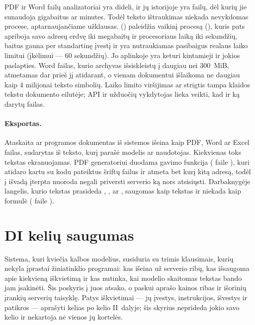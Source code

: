 PDF ir Word failų analizatoriai yra dideli, ir jų istorijoje yra failų, dėl kurių jie
sunaudoja gigabaitus ar minutes. Todėl teksto ištraukimas niekada nevykdomas procese,
aptarnaujančiame užklausas.  () paleidžia
vaikinį procesą (), kuris pats apriboja savo adresų erdvę iki
 \code{=}  megabaitų ir procesoriaus laiką iki
 \code{=}  sekundžių, baitus gauna per standartinę įvestį ir yra
nutraukiamas pasibaigus realaus laiko limitui (įkėlimui --- 60 sekundžių). Jo aplinkoje yra
keturi kintamieji ir jokios paslapties. Word failas, kurio archyvas išsiskleistų į daugiau nei
300~MiB, atmetamas dar prieš jį atidarant, o vienam dokumentui išlaikoma ne daugiau kaip
4 milijonai teksto simbolių. Laiko limito viršijimas ar strigtis tampa klaidos tekstu dokumento
eilutėje; API ir užduočių vykdytojas lieka veikti, kad ir ką darytų failas.

\paragraph{Eksportas.} Ataskaita ar programos dokumentas iš sistemos išeina kaip PDF, Word ar
Excel failas, sudarytas iš teksto, kurį parašė modelis ar naudotojas. Kiekvienas toks tekstas
ekranuojamas. PDF generatoriui duodama gavimo funkcija ( faile
), kuri atidaro kartu su kodu pateiktus šriftų failus ir atmeta bet kurį
kitą adresą, todėl į išvadą įterpta nuoroda negali priversti serverio ką nors atsisiųsti.
Darbaknygėje langelis, kurio tekstas prasideda \code{=}, \code{+}, \code{-} ar ,
saugomas kaip tekstas ir niekada kaip formulė ( faile
).


\section{DI kelių saugumas}\label{sec:security:ai}

Sistema, kuri kviečia kalbos modelius, susiduria su trimis klausimais, kurių nekyla įprastai
žiniatinklio programai: kas išeina už serverio ribų, kas išsaugoma apie kiekvieną iškvietimą ir kas
nutinka, kai modelio skaitomas tekstas bando jam įsakinėti. Šis poskyris į juos atsako, o
paskui aprašo kainos ribas ir išorinių įrankių serverių taisyklę. Patys iškvietimai --- jų
įvestys, instrukcijos, išvestys ir patikros --- aprašyti kelias po kelio II~dalyje; šis
skyrius neprideda jokio savo kelio ir nekartoja nė vienos jų kortelės.

